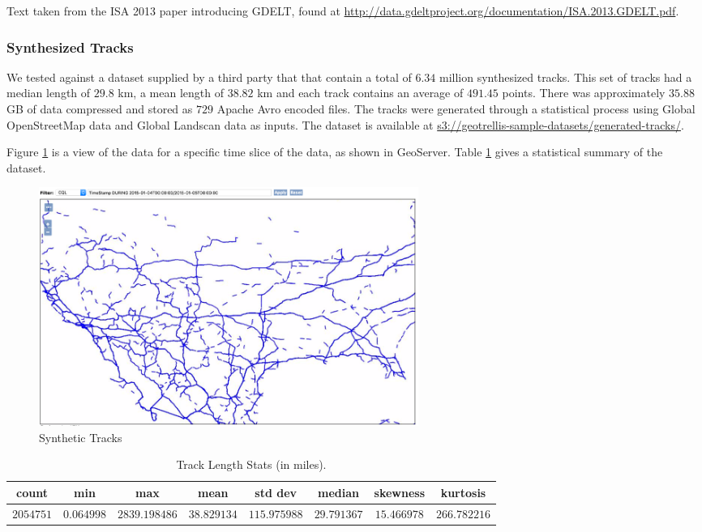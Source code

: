Text taken from the ISA 2013 paper introducing GDELT, found at \url{http://data.gdeltproject.org/documentation/ISA.2013.GDELT.pdf}.


\subsubsection{Synthesized Tracks}
\label{sec:performance:datasets:synthesized}

We tested against a dataset supplied by a third party that that contain a total of $6.34$ million synthesized tracks.
This set of tracks had a median length of $29.8$ km, a mean length of $38.82$ km and each track contains an average of $491.45$ points.
There was approximately $35.88$ GB of data compressed and stored as $729$ Apache Avro encoded files.
The tracks were generated through a statistical process using Global OpenStreetMap data and Global Landscan data as inputs.
The dataset is available at \url{s3://geotrellis-sample-datasets/generated-tracks/}.

Figure \ref{geoserver} is a view of the data for a specific time slice of the data, as shown in GeoServer.
Table \ref{table:lengths} gives a statistical summary of the dataset.

\begin{figure}[h!tb]
  \centering
  \includegraphics[width=0.60\textwidth]{../docs/img/tracks/synthetic-tracks.png}
  \caption{Synthetic Tracks}
  \label{geoserver}
\end{figure}

\begin{table}[h!tb]
  \centering
  \begin{tabular}{ | c | c | c | c | c | c | c | c | }
    \hline
    count & min & max & mean & std dev & median & skewness & kurtosis \\ \hline
    $2054751$ & $0.064998$ & $2839.198486$ & $38.829134$ & $115.975988$ & $29.791367$ & $15.466978$ & $266.782216$ \\
    \hline
  \end{tabular}
  \caption{Track Length Stats (in miles).}
  \label{table:lengths}
\end{table}
